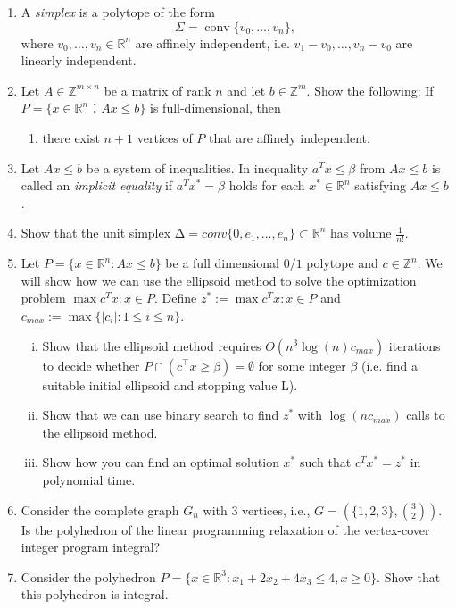 \documentclass[11pt]{article}
\institute{\'Ecole Polytechnique F\'ed\'erale de Lausanne}
\DeclareMathOperator{\conv}{conv}
\newcommand{\setR}{\mathbb{R}}
\newcommand{\setZ}{\mathbb{Z}}
\begin{document}
\makeheader

\begin{enumerate}[1)]

\item A \emph{simplex}  is a polytope of the form
  \begin{displaymath}
    Σ = \conv\{v_0,\dots,v_n\}, 
    \end{displaymath}
    where $v_0,\dots,v_n ∈ ℝ^n$ are affinely independent, i.e. $v_1-v_0, \dots,v_n - v_0$ are linearly independent.

    
\item Let $A ∈ ℤ^{m ×n}$ be a matrix of rank $n$ and let $b ∈ ℤ^m$. Show the following: If $P = \{ x ∈ ℝ^n ： Ax ≤ b\}$ is full-dimensional, then
  \begin{enumerate}
  \item   there exist $n+1$ vertices of $P$ that are affinely independent. 
  \end{enumerate}
\item Let $Ax ≤b$ be a system of inequalities.  %
  In inequality $a^T x ≤ β$ from $Ax ≤b$ is called an \emph{implicit equality} if
    $a^T x^*  = β$ holds for each $x^* ∈ ℝ^n$ satisfying $Ax ≤b$. %

  

\item Show that the unit simplex $∆ = conv\{0,e_1,\hdots,e_n\}⊂\setR^n$ has volume $\frac{1}{n!}$.



\item Let $P= \{x∈\setR^n : Ax≤b\}$ be a full dimensional $0/1$ polytope and $c ∈\setZ^n$. We will show how we
can use the ellipsoid method to solve the optimization problem $\max c^Tx: x∈P$.
Define $z^*:= \max c^Tx: x∈P$ and $c_{max} := \max \{|c_i|: 1 ≤i≤n\}$.
\begin{enumerate}[i)]
\item Show that the ellipsoid method requires $O(n^3 \log(n)c_{max})$ iterations to decide whether $P ∩
(c^⊤x≥β) = ∅$ for some integer $β$ (i.e. find a suitable initial ellipsoid and stopping value L).
\item Show that we can use binary search to find $z^*$ with $\log(nc_{max})$ calls to the ellipsoid method.
\item Show how you can find an optimal solution $x^*$ such that $c^Tx^*= z^*$ in polynomial time.
\end{enumerate}



\item Consider the complete graph $G_n$ with 3 vertices, i.e., $G= (\{1,2,3\}, \binom{3}
{2} )$. Is the polyhedron of the linear programming relaxation of the vertex-cover integer program integral?


\item Consider the polyhedron $P = \{x ∈ \setR^3 : x_1 + 2 x_2 + 4 x_3 ≤ 4, x ≥ 0\}$. Show that this polyhedron is integral. 




\end{enumerate}




  
\end{document}
